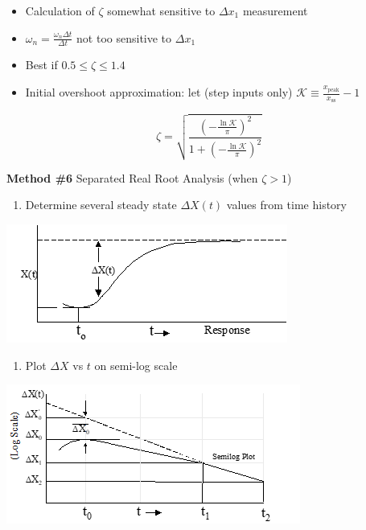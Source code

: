 \documentclass[
]{book}
\providecommand{\tightlist}{%
  \setlength{\itemsep}{0pt}\setlength{\parskip}{0pt}}
\begin{document}
\begin{itemize}
\tightlist
\item
  Calculation of \(\zeta\) somewhat sensitive to \(\Delta x_1\) measurement
\item
  \(\omega_n = \frac{\omega_n \Delta t}{\Delta t}\) not too sensitive to \(\Delta x_1\)
\item
  Best if \(0.5 \leq \zeta \leq 1.4\)
\item
  Initial overshoot approximation: let (step inputs only) \(\mathcal{K} \equiv \frac{x_{\mathrm{peak}}}{x_{\mathrm{ss}}} - 1\)
\end{itemize}

\[
\zeta = \sqrt{\frac{\left( - \frac{\ln \mathcal{K}}{\pi} \right)^2}{1 + \left( - \frac{\ln \mathcal{K}}{\pi} \right)^2}}
\]

\textbf{Method \#6} Separated Real Root Analysis (when \(\zeta \gt 1\))

\begin{enumerate}
\def\labelenumi{\arabic{enumi}.}
\tightlist
\item
  Determine several steady state \(\Delta X \left(t\right)\) values from time history
\end{enumerate}

\includegraphics{media/08/image84.png}

\begin{enumerate}
\def\labelenumi{\arabic{enumi}.}
\setcounter{enumi}{1}
\tightlist
\item
  Plot \(\Delta X\) vs \(t\) on semi-log scale
\end{enumerate}

\includegraphics{media/08/image85.png}
\end{document}
